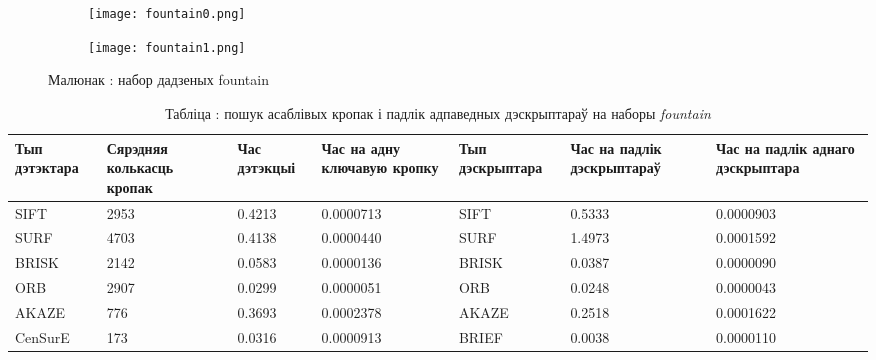 \begin{figure}[H]
\centering
\begin{subfigure}{.5\textwidth}
  \centering
  \texttt{[image: fountain0.png]}
\end{subfigure}%
\begin{subfigure}{.5\textwidth}
  \centering
  \texttt{[image: fountain1.png]}
\end{subfigure}
\captionsetup{labelformat=empty}
\caption{Малюнак : набор дадзеных fountain}
\label{fig:fountain}
\end{figure}

\begin{table}[h]
  \centering
  \begin{footnotesize}
  \begin{tabular}{ | p{16mm} | p{17mm} | p{19mm} | p{22mm} | p{20mm} | p{22mm} | p{22mm} | }
    \hline
    Тып дэтэктара & Сярэдняя колькасць кропак & Час дэтэкцыі & Час на адну ключавую кропку & Тып дэскрыптара & Час на падлік дэскрыптараў & Час на падлік аднаго дэскрыптара \\ \hline
    SIFT & 2953 & 0.4213 & 0.0000713 & SIFT & 0.5333 & 0.0000903 \\ \hline
    SURF & 4703 & 0.4138 & 0.0000440 & SURF & 1.4973 & 0.0001592 \\ \hline
    BRISK & 2142 & 0.0583 & 0.0000136 & BRISK & 0.0387 & 0.0000090 \\ \hline
    ORB & 2907 & 0.0299 & 0.0000051 & ORB & 0.0248 & 0.0000043 \\ \hline
    AKAZE & 776 & 0.3693 & 0.0002378 & AKAZE & 0.2518 & 0.0001622 \\ \hline
    CenSurE & 173 & 0.0316 & 0.0000913 & BRIEF & 0.0038 & 0.0000110 \\ \hline
  \end{tabular}
  \end{footnotesize}
\captionsetup{labelformat=empty,justification=centering}
\caption{Табліца : пошук асаблівых кропак і падлік адпаведных дэскрыптараў на наборы \textit{fountain}}
\label{table:fountain-kp}
\end{table}

